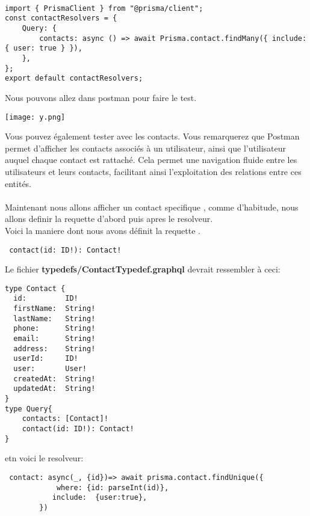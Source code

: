 \documentclass{article}
\begin{document}
\begin{lstlisting}

import { PrismaClient } from "@prisma/client";
const contactResolvers = {
    Query: {
        contacts: async () => await Prisma.contact.findMany({ include: { user: true } }),
    },
};
export default contactResolvers;

\end{lstlisting}
Nous pouvons allez dans postman pour faire le test.

\begin{center} 
    \texttt{[image: y.png]} 
\end{center}
Vous pouvez également tester avec les contacts. Vous remarquerez que Postman permet d'afficher les contacts associés à un utilisateur, ainsi que l'utilisateur auquel chaque contact est rattaché. Cela permet une navigation fluide entre les utilisateurs et leurs contacts, facilitant ainsi l'exploitation des relations entre ces entités.\\\\
Maintenant nous allons afficher un contact specifique , comme d'habitude, nous allons definir la requette d'abord puis apres le resolveur. \\

Voici la maniere dont nous avons définit la requette . 
\begin{lstlisting}
 contact(id: ID!): Contact!
\end{lstlisting}
Le fichier \textbf{typedefs/ContactTypedef.graphql} devrait ressembler à ceci:
\begin{lstlisting}
type Contact {
  id:         ID!       
  firstName:  String!   
  lastName:   String!    
  phone:      String!   
  email:      String!   
  address:    String!  
  userId:     ID!       
  user:       User!      
  createdAt:  String! 
  updatedAt:  String! 
}
type Query{
    contacts: [Contact]!
    contact(id: ID!): Contact!
}
\end{lstlisting}

etn voici le resolveur:
\begin{lstlisting}
 contact: async(_, {id})=> await prisma.contact.findUnique({
            where: {id: parseInt(id)},
           include:  {user:true},
        })
\end{lstlisting}
\end{document}
